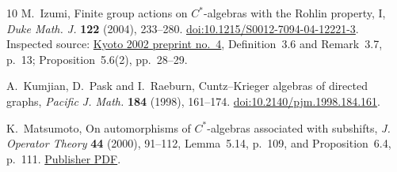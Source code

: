 \documentclass[11pt,a4paper]{article}
\theoremstyle{definition}
\begin{document}
\begin{thebibliography}{10}
 M.~Izumi, Finite group actions on $C^*$-algebras with
the Rohlin property, I, \emph{Duke Math. J.} \textbf{122} (2004), 233--280.
\href{https://doi.org/10.1215/S0012-7094-04-12221-3}{doi:10.1215/S0012-7094-04-12221-3}.
Inspected source: \href{https://www.math.kyoto-u.ac.jp/preprint/2002/4.ps}{Kyoto 2002 preprint no.~4},
Definition~3.6 and Remark~3.7, p.~13; Proposition~5.6(2), pp.~28--29.

 A.~Kumjian, D.~Pask and I.~Raeburn,
Cuntz--Krieger algebras of directed graphs, \emph{Pacific J. Math.}
\textbf{184} (1998), 161--174.
\href{https://doi.org/10.2140/pjm.1998.184.161}{doi:10.2140/pjm.1998.184.161}.

 K.~Matsumoto, On automorphisms of $C^*$-algebras
associated with subshifts, \emph{J. Operator Theory} \textbf{44} (2000),
91--112, Lemma~5.14, p.~109, and Proposition~6.4, p.~111.
\href{https://jot.theta.ro/jot/archive/2000-044-001/2000-044-001-005.pdf}{Publisher PDF}.
\end{thebibliography}
\end{document}
